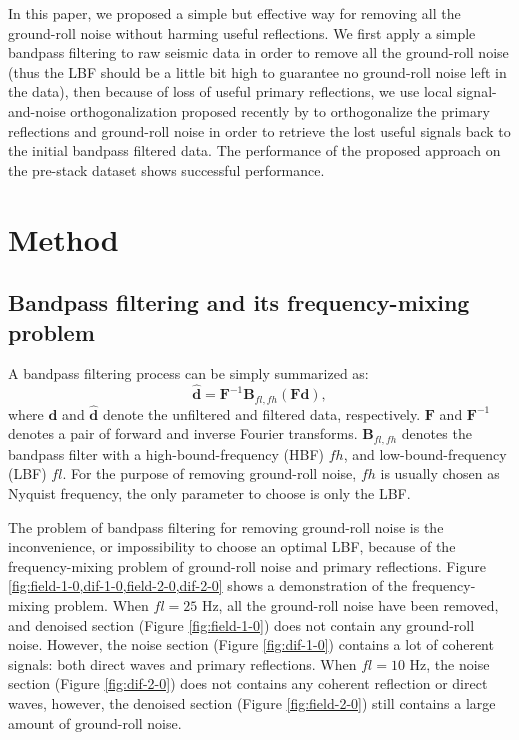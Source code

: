 In this paper, we proposed a simple but effective way for removing all the ground-roll noise without harming useful reflections. We first apply a simple bandpass filtering to raw seismic data in order to remove all the ground-roll noise (thus the LBF should be a little bit high to guarantee no ground-roll noise left in the data), then because of loss of useful primary reflections, we use local signal-and-noise orthogonalization proposed recently by \cite{yangkang2015ortho} to orthogonalize the primary reflections and ground-roll noise in order to retrieve the lost useful signals back to the initial bandpass filtered data. The performance of the proposed approach on the pre-stack dataset shows successful performance.    

\section{Method}
\subsection{Bandpass filtering and its frequency-mixing problem}
A bandpass filtering process can be simply summarized as:
\begin{equation}
\label{eq:bandpass}
\mathbf{\hat{d}} = \mathbf{F}^{-1} \mathbf{B}_{fl,fh} \left(\mathbf{F} \mathbf{d}\right),
\end{equation}
where $\mathbf{d}$ and $\mathbf{\hat{d}}$ denote the unfiltered and filtered data, respectively. $\mathbf{F}$  and $\mathbf{F}^{-1}$ denotes a pair of forward and inverse Fourier transforms. $\mathbf{B}_{fl,fh}$ denotes the bandpass filter with a high-bound-frequency (HBF) $fh$, and low-bound-frequency (LBF) $fl$. For the purpose of removing ground-roll noise, $fh$ is usually chosen as Nyquist frequency, the only parameter to choose is only the LBF. 

The problem of bandpass filtering for removing ground-roll noise is the inconvenience, or impossibility to choose an optimal LBF, because of the frequency-mixing problem of ground-roll noise and primary reflections. Figure \ref{fig:field-1-0,dif-1-0,field-2-0,dif-2-0} shows a demonstration of the frequency-mixing problem. When $fl=25$ Hz, all the ground-roll noise have been removed, and denoised section (Figure \ref{fig:field-1-0}) does not contain any ground-roll noise. However, the noise section (Figure \ref{fig:dif-1-0}) contains a lot of coherent signals: both direct waves and primary reflections. When $fl=10$ Hz, the noise section (Figure \ref{fig:dif-2-0}) does not contains any coherent reflection or direct waves, however, the denoised section (Figure \ref{fig:field-2-0}) still contains a large amount of ground-roll noise. 

